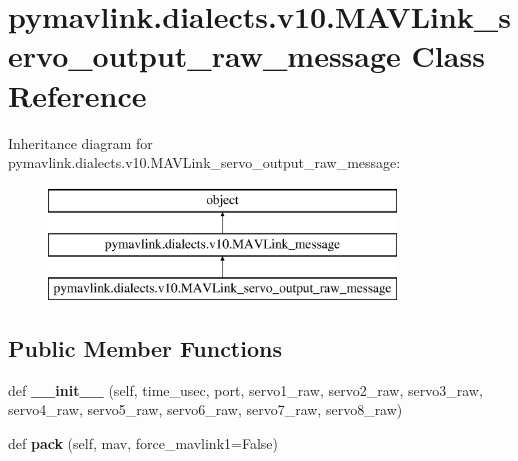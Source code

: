 \hypertarget{classpymavlink_1_1dialects_1_1v10_1_1MAVLink__servo__output__raw__message}{}\section{pymavlink.\+dialects.\+v10.\+M\+A\+V\+Link\+\_\+servo\+\_\+output\+\_\+raw\+\_\+message Class Reference}
\label{classpymavlink_1_1dialects_1_1v10_1_1MAVLink__servo__output__raw__message}
Inheritance diagram for pymavlink.\+dialects.\+v10.\+M\+A\+V\+Link\+\_\+servo\+\_\+output\+\_\+raw\+\_\+message\+:\begin{figure}[H]
\begin{center}
\leavevmode
\includegraphics[height=3.000000cm]{classpymavlink_1_1dialects_1_1v10_1_1MAVLink__servo__output__raw__message}
\end{center}
\end{figure}
\subsection*{Public Member Functions}
\begin{DoxyCompactItemize}
\item 
\mbox{\label{classpymavlink_1_1dialects_1_1v10_1_1MAVLink__servo__output__raw__message_a101c56849d935e3185ba1043e8475938}} 
def {\bfseries \+\_\+\+\_\+init\+\_\+\+\_\+} (self, time\+\_\+usec, port, servo1\+\_\+raw, servo2\+\_\+raw, servo3\+\_\+raw, servo4\+\_\+raw, servo5\+\_\+raw, servo6\+\_\+raw, servo7\+\_\+raw, servo8\+\_\+raw)
\item 
\mbox{\label{classpymavlink_1_1dialects_1_1v10_1_1MAVLink__servo__output__raw__message_a8db662754efcd22d35f3a3b575f12b05}} 
def {\bfseries pack} (self, mav, force\+\_\+mavlink1=False)
\end{DoxyCompactItemize}
